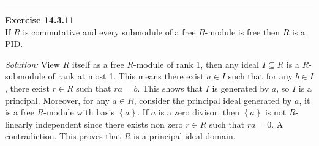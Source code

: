 \documentclass[a4paper, 12pt]{article}
\newenvironment{problem}[2][Exercise]
    { \begin{mdframed}[backgroundcolor=gray!20] \textbf{#1 #2} \\}
    {  \end{mdframed}}
\newenvironment{solution}
    {\textit{Solution:}}
    {}
\begin{document}
\noindent\rule{7in}{2.8pt}
\begin{problem}{14.3.11}
If \(R\) is commutative and every submodule of a free \(R\)-module is free then \(R\) is a PID.
\end{problem}
\begin{solution}
View \(R\) itself as a free \(R\)-module of rank 1, then any ideal \(I\subseteq R\) is a \(R\)-submodule of rank at most 1. This means there exist \(a\in I\) such that for any \(b\in I\), there exist \(r\in R\) such that 
\(ra=b\). This shows that \(I\) is generated by \(a\), so \(I\) is a principal. Moreover, for any \(a\in R\), consider the principal ideal generated by \(a\), it is a free \(R\)-module with basis \(\left\{a\right\}\). If \(a\) is a zero divisor, then \(\left\{a\right\}\) is not \(R\)-linearly independent since there exists non zero \(r\in R\) such that \(ra=0\). A contradiction. This proves that \(R\) is a principal ideal domain. 
\end{solution}
\end{document}
